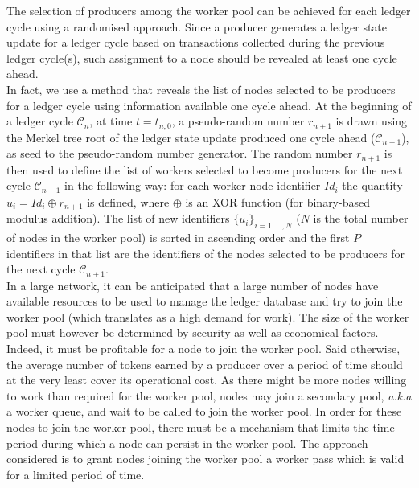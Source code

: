 
The selection of producers among the worker pool can be achieved for each ledger cycle using a randomised approach. Since a producer generates a ledger state update for a ledger cycle based on transactions collected during the previous ledger cycle(s), such assignment to a node should be revealed at least one cycle ahead. \\

In fact, we use a method that reveals the list of nodes selected to be producers for a ledger cycle  using information available one cycle ahead. At the beginning of a ledger cycle $\mathcal{C}_n$, at time $t = t_{n,0}$, a pseudo-random number $r_{n+1}$ is drawn using the Merkel tree root of the ledger state update produced one cycle ahead ($\mathcal{C}_{n-1}$), as seed to the pseudo-random number generator. The random number $r_{n+1}$ is then used to define the list of workers selected to become producers for the next cycle $\mathcal{C}_{n+1}$ in the following way: for each worker node identifier $Id_i$ the quantity $u_i = Id_i \oplus r_{n+1}$ is defined, where $\oplus$ is an XOR function (for binary-based modulus addition). The list of new identifiers $\{u_i \}_{i=1,...,N}$ ($N$ is the total number of nodes in the worker pool) is sorted in ascending order and the first $P$ identifiers in that list are the identifiers of the nodes selected to be producers for the next cycle $\mathcal{C}_{n+1}$.\\


In a large network, it can be anticipated that a large number of nodes have available resources to be used to manage the ledger database and try to join the worker pool (which translates as a high demand for work). The size of the worker pool must however be determined by security as well as economical factors. Indeed, it must be profitable for a node to join the worker pool. Said otherwise, the average number of tokens earned by a producer over a period of time should at the very least cover its operational cost. As there might be more nodes willing to work than required for the worker pool, nodes may join a secondary pool, \textit{a.k.a} a worker queue, and wait to be called to join the worker pool. In order for these nodes to join the worker pool, there must be a mechanism that limits the time period during which a node can persist in the worker pool. The approach considered is to grant nodes joining the worker pool a worker pass which is valid for a limited period of time. \\

